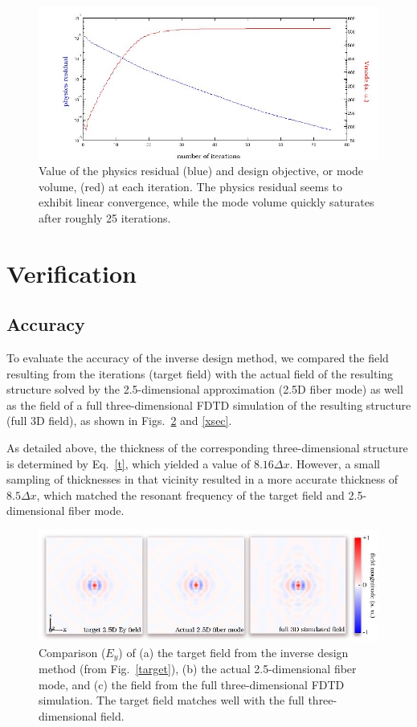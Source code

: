 \documentclass[10pt,letterpaper]{article}
\begin{document}
\begin{figure}[hbt]
\centering\includegraphics[width=\textwidth]{the_prog}
\caption{Value of the physics residual (blue) and design objective, or mode volume, (red) at each iteration. The physics residual seems to exhibit linear convergence, while the mode volume quickly saturates after roughly 25 iterations.}\label{progress}
\end{figure}

\section{Verification} %
\subsection{Accuracy}
To evaluate the accuracy of the inverse design method, we compared the field resulting from the iterations (target field) with the actual field of the resulting structure solved by the 2.5-dimensional approximation (2.5D fiber mode) as well as the field of a full three-dimensional FDTD simulation of the resulting structure (full 3D field), as shown in Figs.~\ref{comp} and \ref{xsec}.

As detailed above, the thickness of the corresponding three-dimensional structure is determined by Eq.~\ref{t}, which yielded a value of $8.16 \Delta x$. However, a small sampling of thicknesses in that vicinity resulted in a more accurate thickness of $8.5\Delta x$, which matched the resonant frequency of the target field and 2.5-dimensional fiber mode.
\begin{figure}[hbt]
\centering\includegraphics[width=\textwidth]{compare}
\caption{Comparison ($E_y$) of (a) the target field from the inverse design method (from Fig.~\ref{target}), (b) the actual 2.5-dimensional fiber mode, and (c) the field from the full three-dimensional FDTD simulation. The target field matches well with the full three-dimensional field.}\label{comp}
\end{figure}
\end{document}

